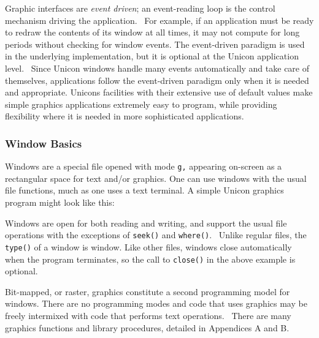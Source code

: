 Graphic interfaces are \textit{event driven}; an
event-reading loop is the control mechanism driving the application.
\ For example, if an application must be ready to redraw the contents
of its window at all times, it may not compute for long periods without
checking for window events. The event-driven paradigm is used in the
underlying implementation, but it is optional at the Unicon application
level. \ Since Unicon windows handle many events automatically and
{\textquotedbl}take care of themselves{\textquotedbl}, applications
follow the event-driven paradigm only when it is needed and
appropriate. Unicon{\textquotesingle}s facilities with their extensive
use of default values make simple graphics applications extremely easy
to program, while providing flexibility where it is needed in more
sophisticated applications.

\subsubsection{Window Basics}

Windows are a special file opened with mode
\texttt{{\textquotedbl}g{\textquotedbl},} appearing on-screen as a
rectangular space for text and/or graphics. One can use windows with
the usual file functions, much as one uses a text terminal. A simple
Unicon graphics program might look like this:


Windows are open for both reading and writing, and support the usual
file operations with the exceptions of \texttt{seek()} and
\texttt{where()}. \ Unlike regular files, the \texttt{type()} of a
window is {\textquotedbl}window{\textquotedbl}. Like other files,
windows close automatically when the program terminates, so the call to
\texttt{close()} in the above example is optional.

Bit-mapped, or raster, graphics constitute a second programming model
for windows. There are no programming
{\textquotedbl}modes{\textquotedbl} and code that uses graphics may be
freely intermixed with code that performs text operations. \ There are
many graphics functions and library procedures, detailed in Appendices
A and B.

